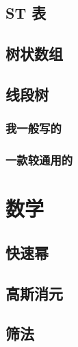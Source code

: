 \documentclass{article}
\begin{document}


\subsection{ST 表}



\subsection{树状数组}



\subsection{线段树}

\subsubsection{我一般写的}



\subsubsection{一款较通用的}



\section{数学}

\subsection{快速幂}



\subsection{高斯消元}



\subsection{筛法}
\end{document}
